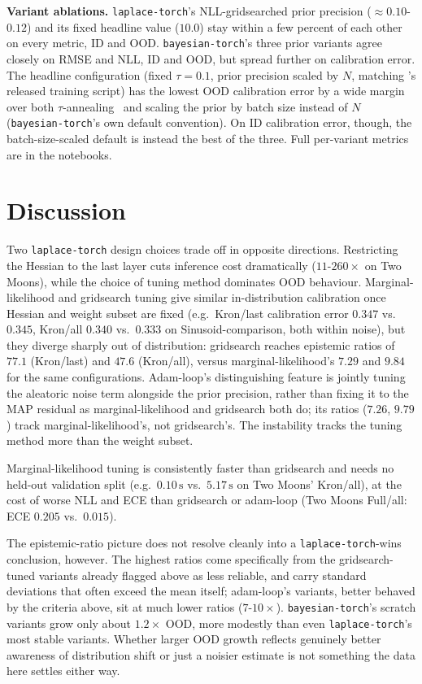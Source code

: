 \documentclass[conference]{IEEEtran}
\begin{document}
\textbf{Variant ablations.}
\texttt{laplace-torch}'s NLL-gridsearched prior precision ($\approx 0.10$-$0.12$) and its
fixed headline value ($10.0$) stay within a few percent of each other on every metric, ID and
OOD. \texttt{bayesian-torch}'s three prior variants agree closely on RMSE and NLL, ID and
OOD, but spread further on calibration error. The headline configuration (fixed
$\tau=0.1$, prior precision scaled by $N$, matching \citet{daxberger2021laplace}'s released
training script) has the lowest OOD calibration error by a wide margin over both
$\tau$-annealing~\citep{osawa2019practical} and scaling the prior by batch size instead of
$N$ (\texttt{bayesian-torch}'s own default convention). On ID calibration error, though, the
batch-size-scaled default is instead the best of the three. Full per-variant metrics are in
the notebooks.

\section{Discussion}
\label{sec:discussion}

Two \texttt{laplace-torch} design choices trade off in opposite directions. Restricting the
Hessian to the last layer cuts inference cost dramatically ($11$-$260\times$ on Two Moons),
while the choice of tuning method dominates OOD behaviour. Marginal-likelihood and
gridsearch tuning give similar in-distribution calibration once Hessian and weight subset
are fixed (e.g.\ Kron/last calibration error $0.347$ vs.\ $0.345$, Kron/all $0.340$ vs.\
$0.333$ on Sinusoid-comparison, both within noise), but they diverge sharply out of
distribution: gridsearch reaches epistemic ratios of $77.1$ (Kron/last) and $47.6$
(Kron/all), versus marginal-likelihood's $7.29$ and $9.84$ for the same configurations.
Adam-loop's distinguishing feature is jointly tuning the aleatoric noise term alongside the
prior precision, rather than fixing it to the MAP residual as marginal-likelihood and
gridsearch both do; its ratios ($7.26$, $9.79$) track marginal-likelihood's, not
gridsearch's. The instability tracks the tuning method more than the weight subset.

Marginal-likelihood tuning is consistently faster than gridsearch and needs no held-out
validation split (e.g.\ $0.10\,\text{s}$ vs.\ $5.17\,\text{s}$ on Two Moons' Kron/all), at
the cost of worse NLL and ECE than gridsearch or adam-loop (Two Moons Full/all: ECE $0.205$
vs.\ $0.015$).

The epistemic-ratio picture does not resolve cleanly into a \texttt{laplace-torch}-wins
conclusion, however. The highest ratios come specifically from the gridsearch-tuned
variants already flagged above as less reliable, and carry standard deviations that often
exceed the mean itself; adam-loop's variants, better behaved by the criteria above, sit at
much lower ratios ($7$-$10\times$). \texttt{bayesian-torch}'s scratch variants grow only
about $1.2\times$ OOD, more modestly than even \texttt{laplace-torch}'s most stable
variants. Whether larger OOD growth reflects genuinely better awareness of distribution
shift or just a noisier estimate is not something the data here settles either way.
\end{document}
